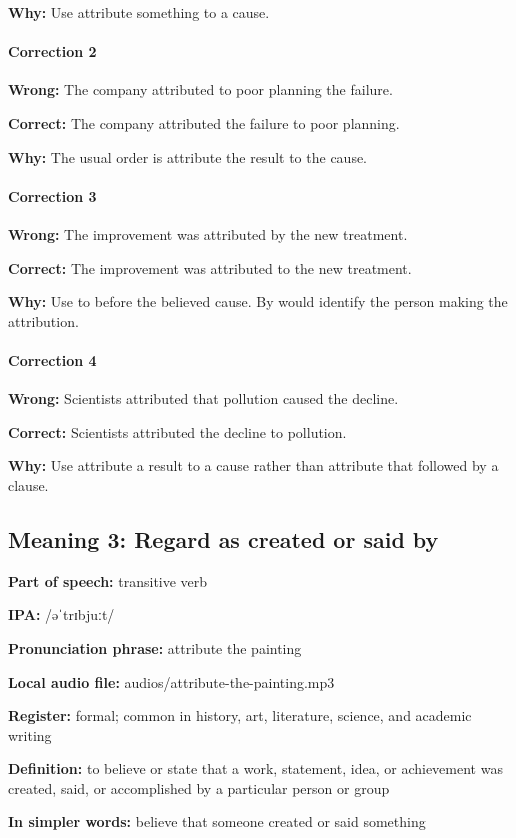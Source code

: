 \documentclass[11pt]{article}
\begin{document}
\textbf{Why:} Use attribute something to a cause.

\paragraph{Correction 2}
\textbf{Wrong:} The company attributed to poor planning the failure.

\textbf{Correct:} The company attributed the failure to poor planning.

\textbf{Why:} The usual order is attribute the result to the cause.

\paragraph{Correction 3}
\textbf{Wrong:} The improvement was attributed by the new treatment.

\textbf{Correct:} The improvement was attributed to the new treatment.

\textbf{Why:} Use to before the believed cause. By would identify the person making the attribution.

\paragraph{Correction 4}
\textbf{Wrong:} Scientists attributed that pollution caused the decline.

\textbf{Correct:} Scientists attributed the decline to pollution.

\textbf{Why:} Use attribute a result to a cause rather than attribute that followed by a clause.

\subsection{Meaning 3: Regard as created or said by}
\textbf{Part of speech:} transitive verb

\textbf{IPA:} /əˈtrɪbjuːt/

\textbf{Pronunciation phrase:} attribute the painting

\textbf{Local audio file:} audios/attribute-the-painting.mp3

\textbf{Register:} formal; common in history, art, literature, science, and academic writing

\textbf{Definition:} to believe or state that a work, statement, idea, or achievement was created, said, or accomplished by a particular person or group

\textbf{In simpler words:} believe that someone created or said something
\end{document}
